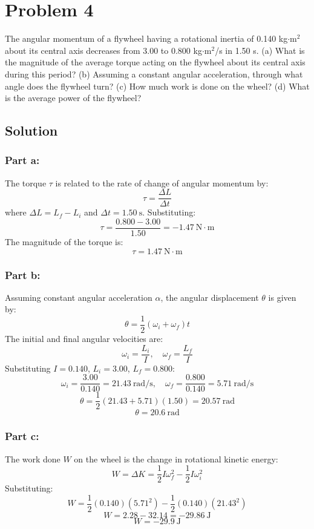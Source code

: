 \documentclass{article}
\begin{document}
\section*{Problem 4}
The angular momentum of a flywheel having a rotational inertia of 0.140 kg$\cdot$m$^2$ about its central axis decreases from 3.00 to 0.800 kg$\cdot$m$^2$/s in 1.50 s. (a) What is the magnitude of the average torque acting on the flywheel about its central axis during this period? (b) Assuming a constant angular acceleration, through what angle does the flywheel turn? (c) How much work is done on the wheel? (d) What is the average power of the flywheel?

\subsection*{Solution}
\subsubsection*{Part a:}
The torque $\tau$ is related to the rate of change of angular momentum by:
\[
\tau = \frac{\Delta L}{\Delta t}
\]
where $\Delta L = L_f - L_i$ and $\Delta t = 1.50\ \text{s}$. Substituting:
\[
\tau = \frac{0.800 - 3.00}{1.50} = -1.47\ \text{N}\cdot\text{m}
\]
The magnitude of the torque is:
\[
\tau = \boxed{1.47\ \text{N}\cdot\text{m}}
\]

\subsubsection*{Part b:}
Assuming constant angular acceleration $\alpha$, the angular displacement $\theta$ is given by:
\[
\theta = \frac{1}{2} \left( \omega_i + \omega_f \right) t
\]
The initial and final angular velocities are:
\[
\omega_i = \frac{L_i}{I},\quad \omega_f = \frac{L_f}{I}
\]
Substituting $I = 0.140$, $L_i = 3.00$, $L_f = 0.800$:
\[
\omega_i = \frac{3.00}{0.140} = 21.43\ \text{rad/s}, \quad \omega_f = \frac{0.800}{0.140} = 5.71\ \text{rad/s}
\]
\[
\theta = \frac{1}{2} \left( 21.43 + 5.71 \right) (1.50) = 20.57\ \text{rad}
\]
\[
\theta = \boxed{20.6\ \text{rad}}
\]

\subsubsection*{Part c:}
The work done $W$ on the wheel is the change in rotational kinetic energy:
\[
W = \Delta K = \frac{1}{2} I \omega_f^2 - \frac{1}{2} I \omega_i^2
\]
Substituting:
\[
W = \frac{1}{2} (0.140) (5.71^2) - \frac{1}{2} (0.140) (21.43^2)
\]
\[
W = 2.28 - 32.14 = -29.86\ \text{J}
\]
\[
W = \boxed{-29.9\ \text{J}}
\]
\end{document}
